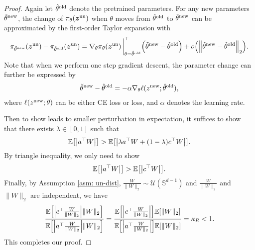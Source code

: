 \begin{proof}
Again let $\hat{\theta}^{\text{old}}$ denote the pretrained parameters. 
For any new parameters $\tilde \theta^{\text{new}}$, 
the change of $\pi_\theta (\boldsymbol{z}^{\text{un}})$ when $\theta$ moves from $\hat{\theta}^{\text{old}}$ to $\tilde \theta^{\text{new}}$ can be approximated by the first-order Taylor expansion with 
\begin{equation*}
\pi_{\tilde{\theta}^\new} (\zv^\un) 
- \pi_{\hat{\theta}^\old} (\zv^\un) 
=
\nabla_\theta \pi_\theta (\zv^\un) 
\eval_{\theta = \hat{\theta}^\old}^\top 
\qty( \tilde{\theta}^\new - \hat{\theta}^\old ) 
+ o\qty(\norm{\hat{\theta}^\new - \hat{\theta}^\old}_2).
\end{equation*}
Note that when we perform one step gradient descent, the parameter change can further be expressed by 
\begin{align*}
    \tilde{\theta}^{\text{new}} - \hat{\theta}^{\text{old}} = - \alpha \nabla_\theta \ell (z^{\text{new}} ; \hat{\theta}^{\text{old}}),
\end{align*}
where $\ell(z^{\text{new}}; \theta)$ can be either CE loss or {\NAME} loss, and $\alpha$ denotes the learning rate. 


Then to show {\NAME} leads to smaller perturbation in expectation, it suffices to show that there exists $\lambda \in [0, 1]$ such that 
\begin{equation*}
    \mathbb{E} \qty[ \qty| a^\top W | ] > \mathbb{E} \qty[ \qty| \lambda a^\top W + (1 - \lambda) c^\top W | ].
\end{equation*}
By triangle inequality, we only need to show
\begin{equation*}
    \mathbb{E} \qty[ \qty| a^\top W | ] > \mathbb{E} \qty[ \qty| c^\top W | ].
\end{equation*}
Finally, by Assumption \ref{asm: un-dist}, $\frac{W}{\|W\|_2} \sim \mathcal{U}(\mathbb{S}^{d-1})$ and $ \frac{W}{\|W\|_2} $ and $ \|W\|_2 $ are independent, we have
\begin{equation*}
    \frac{\mathbb{E} \qty[ \qty| c^\top \frac{W}{\|W\|_2} | \|W\|_2]}{\mathbb{E} \qty[ \qty| a^\top \frac{W}{\|W\|_2} | \|W\|_2 ]} = \frac{\mathbb{E} \qty[ \qty| c^\top \frac{W}{\|W\|_2} | ] \mathbb{E}\qty[\|W\|_2]}{\mathbb{E} \qty[ \qty| a^\top \frac{W}{\|W\|_2} | ] \mathbb{E}\qty[\|W\|_2]} = \kappa_R <1.
\end{equation*}
This completes our proof. 
\end{proof}



